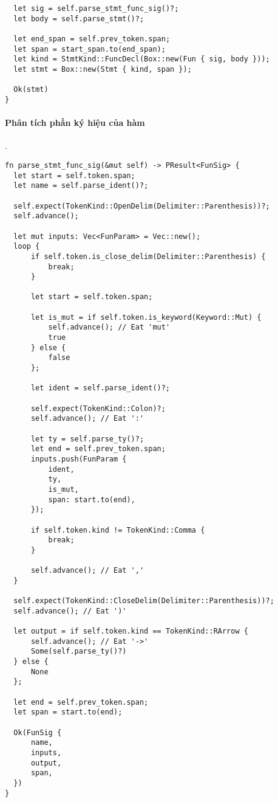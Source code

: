 {\begin{lstlisting}
  let sig = self.parse_stmt_func_sig()?;
  let body = self.parse_stmt()?;

  let end_span = self.prev_token.span;
  let span = start_span.to(end_span);
  let kind = StmtKind::FuncDecl(Box::new(Fun { sig, body }));
  let stmt = Box::new(Stmt { kind, span });

  Ok(stmt)
}
\end{lstlisting}

\paragraph{Phân tích phần ký hiệu của hàm}.
\label{ap1:stmt_decl_fun_sig}
\begin{lstlisting}
fn parse_stmt_func_sig(&mut self) -> PResult<FunSig> {
  let start = self.token.span;
  let name = self.parse_ident()?;

  self.expect(TokenKind::OpenDelim(Delimiter::Parenthesis))?;
  self.advance();

  let mut inputs: Vec<FunParam> = Vec::new();
  loop {
      if self.token.is_close_delim(Delimiter::Parenthesis) {
          break;
      }

      let start = self.token.span;

      let is_mut = if self.token.is_keyword(Keyword::Mut) {
          self.advance(); // Eat 'mut'
          true
      } else {
          false
      };

      let ident = self.parse_ident()?;

      self.expect(TokenKind::Colon)?;
      self.advance(); // Eat ':'

      let ty = self.parse_ty()?;
      let end = self.prev_token.span;
      inputs.push(FunParam {
          ident,
          ty,
          is_mut,
          span: start.to(end),
      });

      if self.token.kind != TokenKind::Comma {
          break;
      }

      self.advance(); // Eat ','
  }

  self.expect(TokenKind::CloseDelim(Delimiter::Parenthesis))?;
  self.advance(); // Eat ')'

  let output = if self.token.kind == TokenKind::RArrow {
      self.advance(); // Eat '->'
      Some(self.parse_ty()?)
  } else {
      None
  };

  let end = self.prev_token.span;
  let span = start.to(end);

  Ok(FunSig {
      name,
      inputs,
      output,
      span,
  })
}
\end{lstlisting}

}
